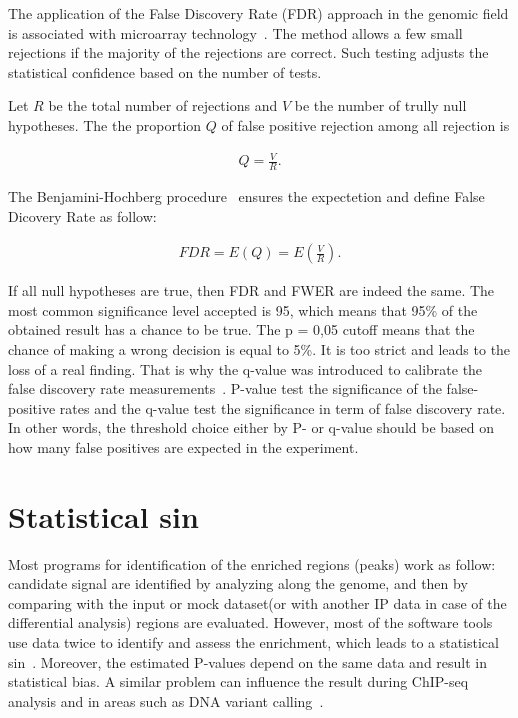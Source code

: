 The application of the False Discovery Rate (FDR) approach in the genomic field is associated with microarray technology~\cite{lai2017statistical}.
The method allows a few small rejections if the majority of the rejections are correct. 
Such testing adjusts the statistical confidence based on the number of tests. 

Let $R$ be the total number of rejections and $V$ be the number of trully null hypotheses.
The the proportion $Q$ of false positive rejection among all rejection is 

\begin{align*}
    Q = \frac{V}{R} .
\end{align*}

The Benjamini-Hochberg procedure~\cite{benjamini2000adaptive} ensures the expectetion and define False Dicovery Rate as follow: 

\begin{align*}
    FDR = E(Q) = E \left(\frac{V}{R}\right) .
\end{align*}

If all null hypotheses are true, then FDR and FWER are indeed the same.
The most common significance level accepted is 95, which means that 95\% of the obtained result has a chance to be true. 
The p = 0,05 cutoff means that the chance of making a wrong decision is equal to 5\%. 
It is too strict and leads to the loss of a real finding. 
That is why the q-value was introduced to calibrate the false discovery rate measurements~\cite{storey2003statistical}. 
P-value test the significance of the false-positive rates and the q-value test the significance in term of false discovery rate. 
In other words, the threshold choice either by P- or q-value should be based on how many false positives are expected in the experiment.



\section{Statistical sin}

Most programs for identification of the enriched regions (peaks) work as follow: candidate signal are identified by analyzing along the genome, and then by comparing with the input or mock dataset(or with another IP data in case of the differential analysis) regions are evaluated. 
However, most of the software tools use data twice to identify and assess the enrichment, which leads to a statistical sin~\cite{lun2014novo}. 
Moreover, the estimated P-values depend on the same data and result in statistical bias.
A similar problem can influence the result during ChIP-seq analysis and in areas such as DNA variant calling~\cite{chitpin2019recap}.

